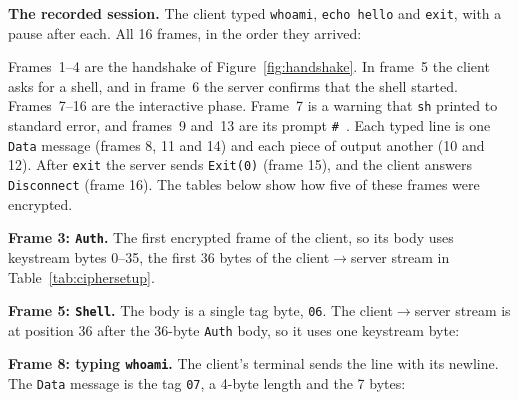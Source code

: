 \textbf{The recorded session.} The client typed \texttt{whoami},
\texttt{echo hello} and \texttt{exit}, with a pause after each. All 16 frames, in
the order they arrived:

\begin{table}[H]
\centering
\footnotesize

\caption{Every frame of the recorded session. ``Keystream'' gives the positions of the keystream bytes used for the body.}
\label{tab:timeline}
\end{table}

Frames~1--4 are the handshake of Figure~\ref{fig:handshake}. In frame~5 the
client asks for a shell, and in frame~6 the server confirms that the shell
started. Frames~7--16 are the interactive phase. Frame~7 is a warning that
\texttt{sh} printed to standard error, and frames~9 and~13 are its prompt
\texttt{\#~}. Each typed line is one \texttt{Data} message (frames 8, 11 and 14)
and each piece of output another (10 and 12). After \texttt{exit} the server
sends \texttt{Exit(0)} (frame 15), and the client answers \texttt{Disconnect}
(frame 16). The tables below
show how five of these frames were encrypted.

\textbf{Frame 3: \texttt{Auth}.} The first encrypted frame of the client, so its
body uses keystream bytes 0--35, the first 36 bytes of the client$\to$server
stream in Table~\ref{tab:ciphersetup}.

\begin{table}[H]
\centering

\caption{Encryption of the \texttt{Auth} message: user \texttt{student}, the client's public key $(n_c, e)$ and the signature $\sigma$ of Table~\ref{tab:auth}.}
\end{table}

\textbf{Frame 5: \texttt{Shell}.} The body is a single tag byte, \texttt{06}.
The client$\to$server stream is at position 36 after the 36-byte \texttt{Auth}
body, so it uses one keystream byte:

\begin{table}[H]
\centering

\caption{Encryption of the \texttt{Shell} request.}
\end{table}

\textbf{Frame 8: typing \texttt{whoami}.} The client's terminal sends the line
with its newline. The \texttt{Data} message is the tag \texttt{07}, a 4-byte
length and the 7 bytes:

\begin{table}[H]
\centering

\caption{Encryption of the typed line \texttt{whoami}.}
\label{tab:xorwhoami}
\end{table}

